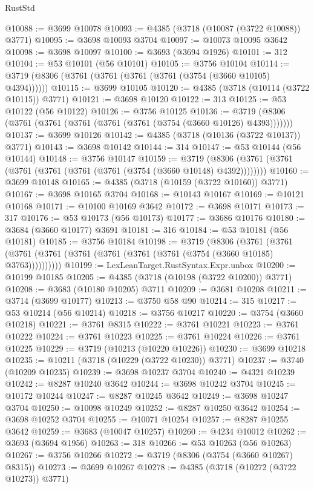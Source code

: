\begin{lexlean}{RustStd}
\begin{coremodule}
{\begin{coremodule}
{{{{{{{{{{{{{{{{{{{{{{{{{{{{{{{{{{{{{{{{{{{{{{{@10088 := @3699 @10078
@10093 := @4385 (@3718 (@10087 (@3722 @10088)) @3771)
@10095 := @3698 @10093 @3704
@10097 := @10073 @10095 @3642
@10098 := @3698 @10097
@10100 := @3693 (@3694 @1926)
@10101 := 312
@10104 := @53 @10101 (@56 @10101)
@10105 := @3756 @10104
@10114 := @3719 (@8306 (@3761 (@3761 (@3761 (@3761 (@3754 (@3660 @10105) @4394))))))
@10115 := @3699 @10105
@10120 := @4385 (@3718 (@10114 (@3722 @10115)) @3771)
@10121 := @3698 @10120
@10122 := 313
@10125 := @53 @10122 (@56 @10122)
@10126 := @3756 @10125
@10136 := @3719 (@8306 (@3761 (@3761 (@3761 (@3761 (@3761 (@3754 (@3660 @10126) @4393)))))))
@10137 := @3699 @10126
@10142 := @4385 (@3718 (@10136 (@3722 @10137)) @3771)
@10143 := @3698 @10142
@10144 := 314
@10147 := @53 @10144 (@56 @10144)
@10148 := @3756 @10147
@10159 := @3719 (@8306 (@3761 (@3761 (@3761 (@3761 (@3761 (@3761 (@3754 (@3660 @10148) @4392))))))))
@10160 := @3699 @10148
@10165 := @4385 (@3718 (@10159 (@3722 @10160)) @3771)
@10167 := @3698 @10165 @3704
@10168 := @10143 @10167
@10169 := @10121 @10168
@10171 := @10100 @10169 @3642
@10172 := @3698 @10171
@10173 := 317
@10176 := @53 @10173 (@56 @10173)
@10177 := @3686 @10176
@10180 := @3684 (@3660 @10177) @3691
@10181 := 316
@10184 := @53 @10181 (@56 @10181)
@10185 := @3756 @10184
@10198 := @3719
    (@8306
      (@3761 (@3761 (@3761 (@3761 (@3761 (@3761 (@3761 (@3761 (@3754 (@3660 @10185) @3763))))))))))
@10199 := LexLeanTarget.RustSyntax.Expr.unbox
@10200 := @10199 @10185
@10205 := @4385 (@3718 (@10198 (@3722 @10200)) @3771)
@10208 := @3683 (@10180 @10205) @3711
@10209 := @3681 @10208
@10211 := @3714 (@3699 @10177)
@10213 := @3750 @58 @90
@10214 := 315
@10217 := @53 @10214 (@56 @10214)
@10218 := @3756 @10217
@10220 := @3754 (@3660 @10218)
@10221 := @3761 @8315
@10222 := @3761 @10221
@10223 := @3761 @10222
@10224 := @3761 @10223
@10225 := @3761 @10224
@10226 := @3761 @10225
@10229 := @3719 (@10213 (@10220 @10226))
@10230 := @3699 @10218
@10235 := @10211 (@3718 (@10229 (@3722 @10230)) @3771)
@10237 := @3740 (@10209 @10235)
@10239 := @3698 @10237 @3704
@10240 := @4321 @10239
@10242 := @8287 @10240 @3642
@10244 := @3698 @10242 @3704
@10245 := @10172 @10244
@10247 := @8287 @10245 @3642
@10249 := @3698 @10247 @3704
@10250 := @10098 @10249
@10252 := @8287 @10250 @3642
@10254 := @3698 @10252 @3704
@10255 := @10071 @10254
@10257 := @8287 @10255 @3642
@10259 := @3683 (@10047 @10257)
@10260 := @4234 @10012
@10262 := @3693 (@3694 @1956)
@10263 := 318
@10266 := @53 @10263 (@56 @10263)
@10267 := @3756 @10266
@10272 := @3719 (@8306 (@3754 (@3660 @10267) @8315))
@10273 := @3699 @10267
@10278 := @4385 (@3718 (@10272 (@3722 @10273)) @3771)
}}}}}}}}}}}}}}}}}}}}}}}}}}}}}}}}}}}}}}}}}}}}}}}
\end{coremodule}}
\end{coremodule}
\end{lexlean}
